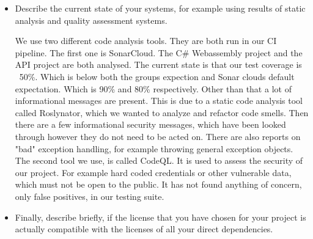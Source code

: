 \begin{itemize}
                                              


  
  .......................
  
  \item Describe the current state of your systems, for example using results of static analysis and quality assessment systems.

        We use two different code analysis tools. 
        They are both run in our CI pipeline. 
        The first one is SonarCloud. The C\# Webassembly project and the API project are both analysed. 
        The current state is that our test coverage is ~50\%. Which is below both the groups expection and Sonar clouds default expectation. 
        Which is 90\% and 80\% respectively. 
        Other than that a lot of informational messages are present. 
        This is due to a static code analysis tool called Roslynator, which we wanted to analyze and refactor code smells. 
        Then there are a few informational security messages, which have been looked through however they do not need to be acted on. 
        There are also reports on "bad" exception handling, for example throwing general exception objects.
        The second tool we use, is called CodeQL. It is used to assess the security of our project.
        For example hard coded credentials or other vulnerable data, which must not be open to the public.
        It has not found anything of concern, only false positives, in our testing suite.
  \item Finally, describe briefly, if the license that you have chosen for your project is actually compatible with the licenses of all your direct dependencies.
  
\end{itemize}